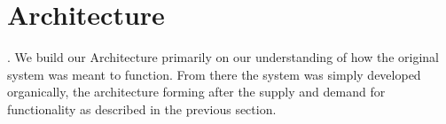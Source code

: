 \section{Architecture}.
We build our Architecture primarily on our understanding of how the original system was meant to function.
From there the system was simply developed organically, the architecture forming after the supply and demand for functionality as described in the previous section.